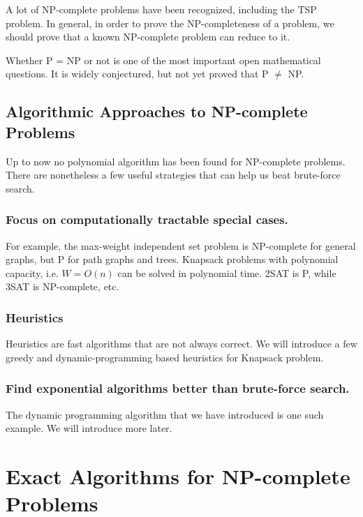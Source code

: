 A lot of NP-complete problems have been recognized, including the TSP problem. In general, in order to prove the NP-completeness of a problem, we should prove that a known NP-complete problem can reduce to it.

Whether P = NP or not is one of the most important open mathematical questions. It is widely conjectured, but not yet proved that P $\neq$ NP.
\subsection{Algorithmic Approaches to NP-complete Problems}
Up to now no polynomial algorithm has been found for NP-complete problems. There are nonetheless a few useful strategies that can help us beat brute-force search.
\subsubsection{Focus on computationally tractable special cases.}
For example, the max-weight independent set problem is NP-complete for general graphs, but P for path graphs and trees. Knapsack problems with polynomial capacity, i.e. $W=O(n)$ can be solved in polynomial time. 2SAT is P, while 3SAT is NP-complete, etc.
\subsubsection{Heuristics}
Heuristics are fast algorithms that are not always correct. We will introduce a few greedy and dynamic-programming based heuristics for Knapsack problem.
\subsubsection{Find exponential algorithms better than brute-force search.}
The dynamic programming algorithm that we have introduced is one such example. We will introduce more later.
\section{Exact Algorithms for NP-complete Problems}
